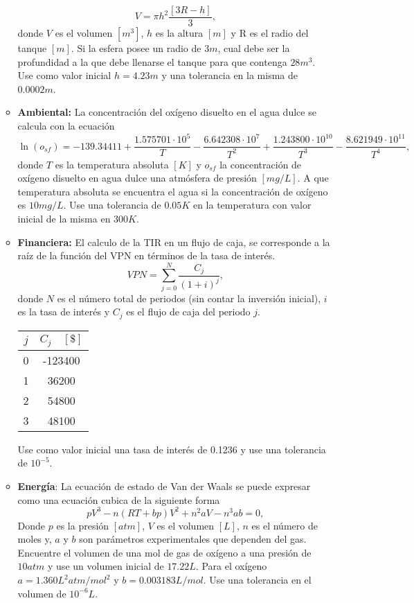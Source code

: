 \documentclass[12pt]{article}
\begin{document}
\begin{enumerate}[leftmargin=*,widest=9]
\begin{itemize}
\begin{equation*}
    V = \pi h^2 \frac{[3R - h]}{3},
    \end{equation*}
    donde \(V\) es el volumen \([m^3]\), \(h\) es la altura \([m]\) y R es el radio del tanque \([m]\). Si la esfera posee un radio de \(3m\), cual debe ser la profundidad a la que debe llenarse el tanque para que contenga \(28m^3\). Use como valor inicial \(h=4.23m\) y una tolerancia en la misma de \(0.0002m\).
    \item \textbf{Ambiental:} La concentración del oxígeno disuelto en el agua dulce se calcula con la ecuación
    \begin{equation*}
    \ln (o_{sf}) = -139.34411 + \frac{1.575701 \cdot 10^5}{T} - \frac{6.642308 \cdot 10^7}{T^2} + \frac{1.243800 \cdot 10^{10}}{T^3} - \frac{8.621949 \cdot 10^{11}}{T^4},
    \end{equation*}
    donde \(T\) es la temperatura absoluta \([K]\) y \(o_{sf}\) la concentración de oxígeno disuelto en agua dulce una atmósfera de presión \([mg/L]\). A que temperatura absoluta se encuentra el agua si la concentración de oxígeno es \(10mg/L\). Use una tolerancia de \(0.05K\) en la temperatura con valor inicial de la misma en \(300K\).
    \item \textbf{Financiera:} El calculo de la TIR en un flujo de caja, se corresponde a la raíz de la función del VPN en términos de la tasa de interés.
    \begin{equation*}
    VPN = \sum\limits_{j=0}^N \frac{C_j}{(1+i)^j},
\end{equation*}
donde \(N\) es el número total de periodos (sin contar la inversión inicial), \(i\) es la tasa de interés y \(C_j\) es el flujo de caja del periodo \(j\).
\begin{center}
\begin{tabular}{|c|c|}
\hline
\(j\) & \(C_j \quad [\$]\) \\
\hline
0 & -123400\\
1 & 36200\\
2 & 54800\\
3 & 48100\\
\hline
\end{tabular}
\end{center}
Use como valor inicial una tasa de interés de 0.1236 y use una tolerancia de \(10^{-5}\).
\item \textbf{Energía}: La ecuación de estado de Van der Waals se puede expresar como una ecuación cubica de la siguiente forma
\begin{equation}
pV^3-n(RT + bp)V^2 + n^2aV - n^3ab = 0,
\end{equation}
Donde \(p\) es la presión \([atm]\), \(V\) es el volumen \([L]\), \(n\) es el número de moles y, \(a\) y \(b\) son parámetros experimentales que dependen del gas. Encuentre el volumen de una mol de gas de oxígeno a una presión de \(10atm\) y use un volumen inicial de \(17.22L\). Para el oxígeno \(a= 1.360L^2 atm / mol^2\) y \(b= 0.003183L/mol\). Use una tolerancia en el volumen de \(10^{-6}L\).
    \end{itemize}
  \end{enumerate}
\end{document}
